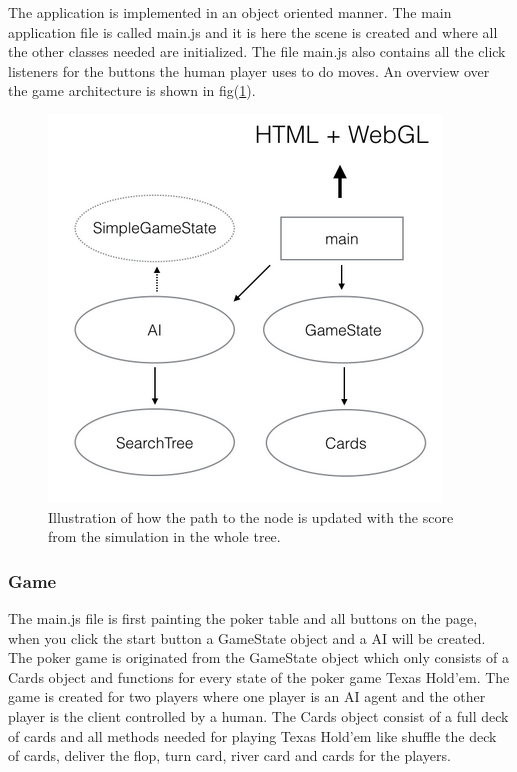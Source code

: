 \documentclass[journal]{vgtc}                %
\begin{document}
The application is implemented in an object oriented manner. The main application file is called main.js and it is here the scene is created and where all the other classes needed are initialized. The file main.js also contains all the click listeners for the buttons the human player uses to do moves. An overview over the game architecture is shown in fig(\ref{fig:arcitect}). 
\begin{figure}[here]
  \begin{center}
    \includegraphics[scale=0.50]{img/arcitect.png}
    \caption{\label{fig:arcitect} Illustration of how the path to the node is updated with the score from the simulation in the whole tree.}
  \end{center}
\end{figure}

\subsubsection{Game}
The main.js file is first painting the poker table and all buttons on the page, when you click the start button a GameState object and a AI will be created.
The poker game is originated from the GameState object which only consists of a Cards object and functions for every state of the poker game Texas Hold'em. The game is created for two players where one player is an AI agent and the other player is the client controlled by a human. The Cards object consist of a full deck of cards and all methods needed for playing Texas Hold'em like shuffle the deck of cards, deliver the flop, turn card, river card and cards for the players.
\end{document}

